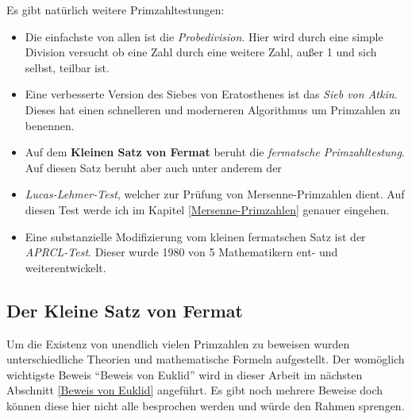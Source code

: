 \documentclass[german,12pt,a4paper]{article}
\begin{document}
Es gibt natürlich weitere Primzahltestungen:
\begin{itemize}
    \item Die einfachste von allen ist die \textit{Probedivision}.
    Hier wird durch eine simple Division versucht ob eine Zahl durch eine weitere Zahl, außer 1 und sich selbst, teilbar ist.
    \item Eine verbesserte Version des Siebes von Eratosthenes ist das \textit{Sieb von Atkin}.
    Dieses hat einen schnelleren und moderneren Algorithmus um Primzahlen zu benennen.
    \item Auf dem \textbf{Kleinen Satz von Fermat} beruht die \textit{fermatsche Primzahltestung}.
    Auf diesen Satz beruht aber auch unter anderem der
    \item \textit{Lucas-Lehmer-Test}, welcher zur Prüfung von Mersenne-Primzahlen dient.
    Auf diesen Test werde ich im Kapitel \ref{Mersenne-Primzahlen} genauer eingehen.
    \item Eine substanzielle Modifizierung vom kleinen fermatschen Satz ist der \textit{APRCL-Test}.
    Dieser wurde 1980 von 5 Mathematikern ent- und weiterentwickelt.
\end{itemize}

\subsection{Der Kleine Satz von Fermat}\label{Der Kleine Satz von Fermat}

Um die Existenz von unendlich vielen Primzahlen zu beweisen wurden unterschiedliche Theorien und mathematische Formeln aufgestellt.
Der womöglich wichtigste Beweis “Beweis von Euklid” wird in dieser Arbeit im nächsten Abschnitt \ref{Beweis von Euklid} angeführt.
Es gibt noch mehrere Beweise doch können diese hier nicht alle besprochen werden und würde den Rahmen sprengen.
\end{document}
